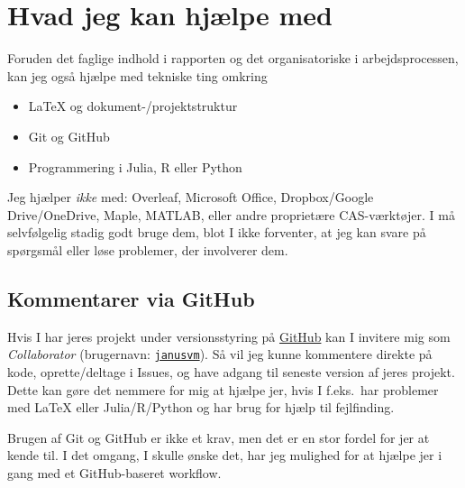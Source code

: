 \section{Hvad jeg kan hjælpe med}
\label{sec:help}
Foruden det faglige indhold i rapporten og det organisatoriske i arbejdsprocessen, kan jeg også hjælpe med tekniske ting omkring
\begin{itemize}
\item \LaTeX{} og dokument-/projektstruktur
\item Git og GitHub
\item Programmering i Julia, R eller Python
\end{itemize}
Jeg hjælper \emph{ikke} med: Overleaf, Microsoft Office, Dropbox/Google Drive/OneDrive, Maple, MATLAB, eller andre proprietære CAS-værktøjer.
I må selvfølgelig stadig godt bruge dem, blot I ikke forventer, at jeg kan svare på spørgsmål eller løse problemer, der involverer dem.

\subsection{Kommentarer via GitHub}
\label{subsec:github}
Hvis I har jeres projekt under versionsstyring på \href{https://github.com}{GitHub} kan I invitere mig som \emph{Collaborator} (brugernavn: \href{https://github.com/janusvm}{\texttt{janusvm}}).
Så vil jeg kunne kommentere direkte på kode, oprette/deltage i Issues, og have adgang til seneste version af jeres projekt.
Dette kan gøre det nemmere for mig at hjælpe jer, hvis I f.eks.\ har problemer med \LaTeX{} eller Julia/R/Python og har brug for hjælp til fejlfinding.

Brugen af Git og GitHub er ikke et krav, men det er en stor fordel for jer at kende til.
I det omgang, I skulle ønske det, har jeg mulighed for at hjælpe jer i gang med et GitHub-baseret workflow.
